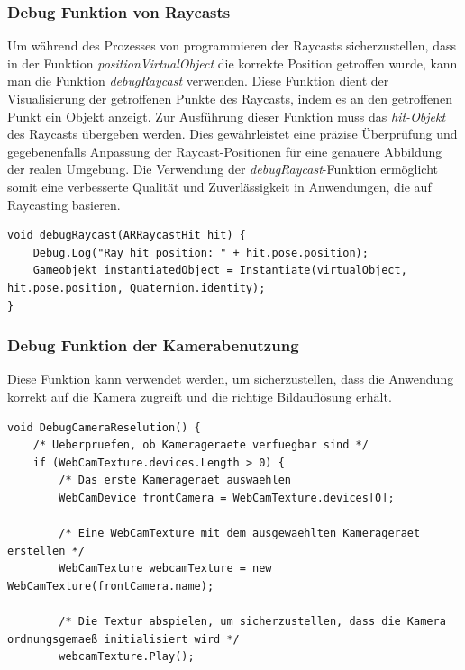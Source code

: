 \begin{itemize}
    \subsubsection{Debug Funktion von Raycasts}
    Um während des Prozesses von programmieren der Raycasts sicherzustellen, dass in der Funktion \textit{positionVirtualObject} die korrekte Position getroffen wurde, kann man die Funktion \textit{debugRaycast} verwenden. Diese Funktion dient der Visualisierung der getroffenen Punkte des Raycasts, indem es an den getroffenen Punkt ein Objekt anzeigt. Zur Ausführung dieser Funktion muss das \textit{hit-Objekt} des Raycasts übergeben werden. Dies gewährleistet eine präzise Überprüfung und gegebenenfalls Anpassung der Raycast-Positionen für eine genauere Abbildung der realen Umgebung. Die Verwendung der \textit{debugRaycast}-Funktion ermöglicht somit eine verbesserte Qualität und Zuverlässigkeit in Anwendungen, die auf Raycasting basieren.
    \begin{lstlisting}[style=csharp, caption={Debug Funktion von Raycasts}, label=code:debugRaycast]
void debugRaycast(ARRaycastHit hit) {
    Debug.Log("Ray hit position: " + hit.pose.position);
    Gameobjekt instantiatedObject = Instantiate(virtualObject, hit.pose.position, Quaternion.identity);
}
    \end{lstlisting}
    \subsubsection{Debug Funktion der Kamerabenutzung}
    Diese Funktion kann verwendet werden, um sicherzustellen, dass die Anwendung korrekt auf die Kamera zugreift und die richtige Bildauflösung erhält.
    \begin{lstlisting}[style=csharp, caption={Debug Funktion von der Kamera Benutzung}, label=code:debugRaycast]
void DebugCameraReselution() {
    /* Ueberpruefen, ob Kamerageraete verfuegbar sind */
    if (WebCamTexture.devices.Length > 0) {
        /* Das erste Kamerageraet auswaehlen
        WebCamDevice frontCamera = WebCamTexture.devices[0];

        /* Eine WebCamTexture mit dem ausgewaehlten Kamerageraet erstellen */
        WebCamTexture webcamTexture = new WebCamTexture(frontCamera.name);

        /* Die Textur abspielen, um sicherzustellen, dass die Kamera ordnungsgemaeß initialisiert wird */
        webcamTexture.Play();


\end{lstlisting}
\end{itemize}
